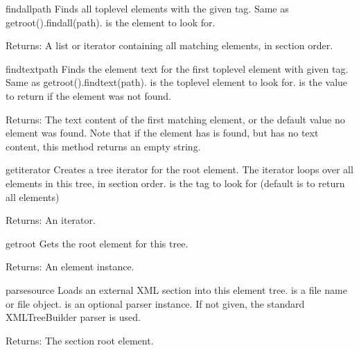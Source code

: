 \begin{methoddesc}{findall}{path}
Finds all toplevel elements with the given tag.
Same as getroot().findall(path).
 is the element to look for.

\begin{datadescni}{Returns:}
A list or iterator containing all matching elements,
in section order.
\end{datadescni}
\end{methoddesc}

\begin{methoddesc}{findtext}{path}
Finds the element text for the first toplevel element with given
tag.  Same as getroot().findtext(path).
 is the toplevel element to look for.
 is the value to return if the element was not found.

\begin{datadescni}{Returns:}
The text content of the first matching element, or the
default value no element was found.  Note that if the element
has is found, but has no text content, this method returns an
empty string.
\end{datadescni}
\end{methoddesc}

\begin{methoddesc}{getiterator}{}
Creates a tree iterator for the root element.  The iterator loops
over all elements in this tree, in section order.
 is the tag to look for (default is to return all elements)

\begin{datadescni}{Returns:}
An iterator.
\end{datadescni}
\end{methoddesc}

\begin{methoddesc}{getroot}{}
Gets the root element for this tree.

\begin{datadescni}{Returns:}
An element instance.
\end{datadescni}
\end{methoddesc}

\begin{methoddesc}{parse}{source}
Loads an external XML section into this element tree.
 is a file name or file object.
 is an optional parser instance.  If not given, the
standard XMLTreeBuilder parser is used.

\begin{datadescni}{Returns:}
The section root element.
\end{datadescni}
\end{methoddesc}

